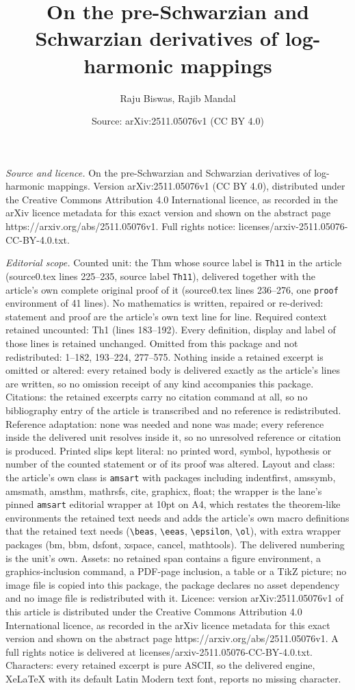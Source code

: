 \documentclass[10pt,a4paper]{amsart}
\title[On the pre-Schwarzian and Schwarzian derivatives of log-harm]{On the pre-Schwarzian and Schwarzian derivatives of log-harmonic mappings}
\author{Raju Biswas, Rajib Mandal}
\date{Source: arXiv:2511.05076v1 (CC BY 4.0)}
\begin{document}
\maketitle

\noindent\emph{Source and licence.} On the pre-Schwarzian and Schwarzian derivatives of log-harmonic mappings. Version arXiv:2511.05076v1 (CC BY 4.0), distributed under the Creative Commons Attribution 4.0 International licence, as recorded in the arXiv licence metadata for this exact version and shown on the abstract page https://arxiv.org/abs/2511.05076v1. Full rights notice: licenses/arxiv-2511.05076-CC-BY-4.0.txt.\par\smallskip

\noindent\textit{Editorial scope.} Counted unit: the Thm whose source label is \texttt{Th11} in the article (source0.tex lines 225--235, source label \texttt{Th11}), delivered together with the article's own complete original proof of it (source0.tex lines 236--276, one \texttt{proof} environment of 41 lines). No mathematics is written, repaired or re-derived: statement and proof are the article's own text line for line. Required context retained uncounted: Th1 (lines 183--192). Every definition, display and label of those lines is retained unchanged. Omitted from this package and not redistributed: 1--182, 193--224, 277--575. Nothing inside a retained excerpt is omitted or altered: every retained body is delivered exactly as the article's lines are written, so no omission receipt of any kind accompanies this package. Citations: the retained excerpts carry no citation command at all, so no bibliography entry of the article is transcribed and no reference is redistributed. Reference adaptation: none was needed and none was made; every reference inside the delivered unit resolves inside it, so no unresolved reference or citation is produced. Printed slips kept literal: no printed word, symbol, hypothesis or number of the counted statement or of its proof was altered. Layout and class: the article's own class is \texttt{amsart} with packages including indentfirst, amssymb, amsmath, amsthm, mathrsfs, cite, graphicx, float; the wrapper is the lane's pinned \texttt{amsart} editorial wrapper at 10pt on A4, which restates the theorem-like environments the retained text needs and adds the article's own macro definitions that the retained text needs (\texttt{\textbackslash beas}, \texttt{\textbackslash eeas}, \texttt{\textbackslash epsilon}, \texttt{\textbackslash ol}), with extra wrapper packages (bm, bbm, dsfont, xspace, cancel, mathtools). The delivered numbering is the unit's own. Assets: no retained span contains a figure environment, a graphics-inclusion command, a PDF-page inclusion, a table or a TikZ picture; no image file is copied into this package, the package declares no asset dependency and no image file is redistributed with it. Licence: version arXiv:2511.05076v1 of this article is distributed under the Creative Commons Attribution 4.0 International licence, as recorded in the arXiv licence metadata for this exact version and shown on the abstract page https://arxiv.org/abs/2511.05076v1. A full rights notice is delivered at licenses/arxiv-2511.05076-CC-BY-4.0.txt. Characters: every retained excerpt is pure ASCII, so the delivered engine, XeLaTeX with its default Latin Modern text font, reports no missing character.
\end{document}
